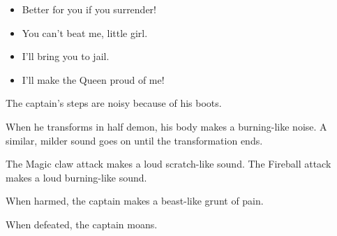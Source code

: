 \begin{itemize}
	\item Better for you if you surrender!
	\item You can't beat me, little girl.
	\item I'll bring you to jail.
	\item I'll make the Queen proud of me!
\end{itemize}

The captain's steps are noisy because of his boots.

When he transforms in half demon, his body makes a burning-like noise. A similar, milder sound goes on until the transformation ends.

The Magic claw attack makes a loud scratch-like sound. The Fireball attack makes a loud burning-like sound.

When harmed, the captain makes a beast-like grunt of pain.

When defeated, the captain moans.
